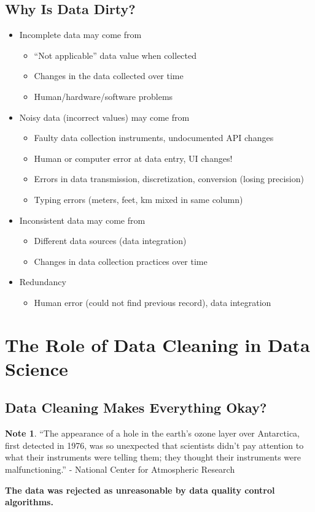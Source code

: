 \documentclass[11pt]{article}
\theoremstyle{definition}
\newtheorem{note}{Note}
\begin{document}
\subsection{Why Is Data Dirty?}
\begin{itemize}
    \item Incomplete data may come from
    \begin{itemize}
        \item “Not applicable” data value when collected
        \item Changes in the data collected over time
        \item Human/hardware/software problems
    \end{itemize}
    \item Noisy data (incorrect values) may come from
    \begin{itemize}
        \item Faulty data collection instruments, undocumented API changes
        \item Human or computer error at data entry, UI changes!
        \item Errors in data transmission, discretization, conversion (losing precision)
        \item Typing errors (meters, feet, km mixed in same column)
    \end{itemize}
    \item Inconsistent data may come from
    \begin{itemize}
        \item Different data sources (data integration)
        \item Changes in data collection practices over time
    \end{itemize}
    \item Redundancy
    \begin{itemize}
        \item Human error (could not find previous record), data integration
    \end{itemize}
\end{itemize}

\section{The Role of Data Cleaning in
Data Science}

\subsection{Data Cleaning Makes Everything Okay?}
\begin{note}
    “The appearance of a hole in the
earth's ozone layer over
Antarctica, first detected in 1976,
was so unexpected that scientists
didn't pay attention to what their
instruments were telling them;
they thought their instruments
were malfunctioning.”
- National Center for
Atmospheric Research
\end{note}
\textbf{The data was rejected as unreasonable by data quality control algorithms.}
\end{document}
